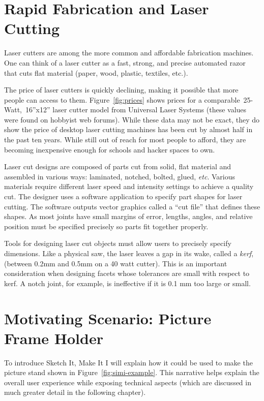 \section{Rapid Fabrication and Laser Cutting}

Laser cutters are among the more common and affordable fabrication
machines. One can think of a laser cutter as a fast, strong, and
precise automated razor that cuts flat material (paper, wood, plastic,
textiles, etc.). 



The price of laser cutters is quickly declining, making it possible
that more people can access to them. Figure~\ref{fig:prices} shows
prices for a comparable~25-Watt,~16''x12'' laser cutter model from
Universal Laser Systems (these values were found on hobbyist web
forums). While these data may not be exact, they do show the price of
desktop laser cutting machines has been cut by almost half in the past
ten years. While still out of reach for most people to afford, they
are becoming inexpensive enough for schools and hacker spaces to own.

Laser cut designs are composed of parts cut from solid, flat material
and assembled in various ways: laminated, notched, bolted, glued,
\textit{etc}. Various materials require different laser speed and
intensity settings to achieve a quality cut. The designer uses a
software application to specify part shapes for laser cutting. The
software outputs vector graphics called a ``cut file'' that defines
these shapes. As most joints have small margins of error, lengths,
angles, and relative position must be specified precisely so parts fit
together properly.

Tools for designing laser cut objects must allow users to precisely
specify dimensions. Like a physical saw, the laser leaves a gap in its
wake, called a \textit{kerf}, (between 0.2mm and 0.5mm on a 40 watt
cutter). This is an important consideration when designing facets
whose tolerances are small with respect to kerf. A notch joint, for
example, is ineffective if it is 0.1 mm too large or small.

\section{Motivating Scenario: Picture Frame Holder}



To introduce Sketch It, Make It I will explain how it could be used to
make the picture stand shown in Figure~\ref{fig:simi-example}. This
narrative helps explain the overall user experience while exposing
technical aspects (which are discussed in much greater detail in the
following chapter).

